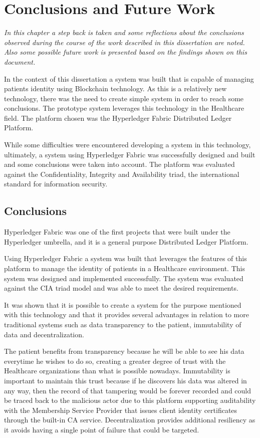 \chapter{Conclusions and Future Work}
\label{Conclusion}

\emph{In this chapter a step back is taken and some reflections about the
conclusions observed during the course of the work described in this
dissertation are noted. Also some possible future work is presented based on
the findings shown on this document.}

In the context of this dissertation a system was built that is capable of
managing patients identity using Blockchain technology. As this is a relatively
new technology, there was the need to create simple system in order to reach
some conclusions. The prototype system leverages this technology in the
Healthcare field. The platform chosen was the Hyperledger Fabric Distributed
Ledger Platform. 

While some difficulties were encountered developing a system in this
technology, ultimately, a system using Hyperledger Fabric was successfully
designed and built and some conclusions were taken into account. The platform
was evaluated against the Confidentiality, Integrity and Availability triad,
the international standard for information security.

\section{Conclusions}

Hyperledger Fabric was one of the first projects that were built under the
Hyperledger umbrella, and it is a general purpose Distributed Ledger Platform.

Using Hyperledger Fabric a system was built that leverages the features of this
platform to manage the identity of patients in a Healthcare environment. This
system was designed and implemented successfully. The system was evaluated
against the CIA triad model and was able to meet the desired requirements.

It was shown that it is possible to create a system for the purpose mentioned
with this technology and that it provides several advantages in relation to
more traditional systems such as data transparency to the patient, immutability
of data and decentralization.

The patient benefits from transparency because he will be able to see his data
everytime he wishes to do so, creating a greater degree of trust with the
Healthcare organizations than what is possible nowadays. Immutability is
important to maintain this trust because if he discovers his data was altered
in any way, then the record of that tampering would be forever recorded and
could be traced back to the malicious actor due to this platform supporting
auditability with the Membership Service Provider that issues client identity
certificates through the built-in CA service.  Decentralization provides
additional resiliency as it avoids having a single point of failure that could
be targeted.

